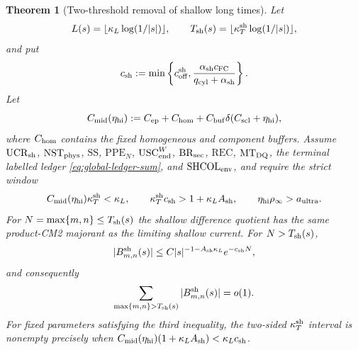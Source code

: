 \documentclass[11pt]{article}
\newtheorem{theorem}{Theorem}[section]
\begin{document}
\begin{theorem}[Two-threshold removal of shallow long times]
\label{thm:shallow-two-threshold}
Let
\[
 L(s)=\lfloor\kappa_L\log(1/|s|)\rfloor,
 \qquad T_{\rm sh}(s)=\lfloor\kappa_T^{\rm sh}\log(1/|s|)\rfloor,
\]
and put
\begin{equation}
\label{eq:shallow-collar-rate}
 c_{\rm sh}:=\min\left\{c_{\rm off}^{\rm sh},
 \frac{\alpha_{\rm sh}c_{\rm FC}}
 {q_{\rm cyl}+\alpha_{\rm sh}}\right\}.
\end{equation}
Let
\begin{equation}
\label{eq:intermediate-resolving-constant}
 C_{\rm mid}(\eta_{\rm hi})
 :=C_{\rm ep}+C_{\rm hom}
   +C_{\rm buf}\delta(C_{\rm scl}+\eta_{\rm hi}),
\end{equation}
where $C_{\rm hom}$ contains the fixed homogeneous and component buffers.
Assume $\mathrm{UCR}_{\rm sh}$, $\mathrm{NST}_{\rm phys}$,
$\mathrm{SS}$, $\mathrm{PPE}_{N}$,
$\mathrm{USC}_{\rm end}^{W}$,
$\mathrm{BR}_{\rm sec}$, $\mathrm{REC}$, $\mathrm{MT}_{\rm DQ}$, the
terminal labelled ledger \eqref{eq:global-ledger-sum}, and
$\mathrm{SHCOL}_{\rm env}$, and require the strict window
\begin{equation}
\label{eq:shallow-time-window}
 C_{\rm mid}(\eta_{\rm hi})\kappa_T^{\rm sh}<\kappa_L,
 \qquad
 \kappa_T^{\rm sh}c_{\rm sh}>1+\kappa_LA_{\rm sh},
 \qquad \eta_{\rm hi}\rho_\infty>a_{\rm ultra}.
\end{equation}
For $N=\max\{m,n\}\le T_{\rm sh}(s)$ the shallow difference quotient has
the same product-CM2 majorant as the limiting shallow current.  For
$N>T_{\rm sh}(s)$,
\begin{equation}
\label{eq:shallow-long-time-bound}
 |B^{\rm sh}_{m,n}(s)|
 \le C|s|^{-1-A_{\rm sh}\kappa_L}e^{-c_{\rm sh}N},
\end{equation}
and consequently
\begin{equation}
\label{eq:shallow-long-time-sum}
 \sum_{\max\{m,n\}>T_{\rm sh}(s)}
 |B^{\rm sh}_{m,n}(s)|=o(1).
\end{equation}
For fixed parameters satisfying the third inequality, the two-sided
$\kappa_T^{\rm sh}$ interval is nonempty precisely when
$C_{\rm mid}(\eta_{\rm hi})(1+\kappa_LA_{\rm sh})
 <\kappa_Lc_{\rm sh}$.
\end{theorem}
\end{document}
